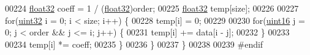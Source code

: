 \begin{DoxyCode}
00224         \hyperlink{definitions_8hpp_aacdc525d6f7bddb3ae95d5c311bd06a1}{float32} coeff = 1 / (\hyperlink{definitions_8hpp_aacdc525d6f7bddb3ae95d5c311bd06a1}{float32})order;
00225         \hyperlink{definitions_8hpp_aacdc525d6f7bddb3ae95d5c311bd06a1}{float32} temp[size];
00226 
00227         \textcolor{keywordflow}{for}(\hyperlink{definitions_8hpp_a1134b580f8da4de94ca6b1de4d37975e}{uint32} i = 0; i < size; i++) \{
00228             temp[i] = 0;
00229 
00230             \textcolor{keywordflow}{for}(\hyperlink{definitions_8hpp_a05f6b0ae8f6a6e135b0e290c25fe0e4e}{uint16} j = 0; j < order && j <= i; j++) \{
00231                 temp[i] += data[i - j];
00232             \}
00233 
00234             temp[i] *= coeff;
00235         \}
00236     \}
00237 \}
00238 
00239 \textcolor{preprocessor}{#endif}
\end{DoxyCode}
